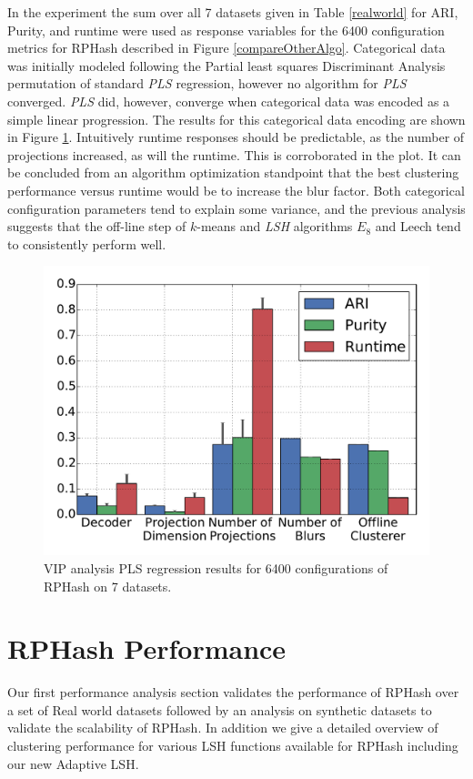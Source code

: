 In the experiment the sum over all 7 datasets given in Table \ref{realworld} for ARI, Purity, and
runtime were used as response variables for the 6400 configuration metrics for \textsf{RPHash}
described in Figure \ref{compareOtherAlgo}.  Categorical data was initially modeled following the
Partial least squares Discriminant Analysis permutation of standard \emph{PLS} regression, however
no algorithm for \emph{PLS} converged.  \emph{PLS} did, however, converge when categorical data was
encoded as a simple linear progression.  The results for this categorical data encoding are shown in
Figure \ref{PLSreg}.  Intuitively runtime responses should be predictable, as the number of
projections increased, as will the runtime.  This is corroborated in the plot.  It can be concluded
from an algorithm optimization standpoint that the best clustering performance versus runtime would
be to increase the blur factor.  Both categorical configuration parameters tend to explain some
variance, and the previous analysis suggests that the off-line step of $k$-means and \emph{LSH}
algorithms $E_8$ and Leech tend to consistently perform well.

\begin{figure}
  \centerline{\includegraphics[width=.8\textwidth]{figs/correlation}}
  \caption{VIP analysis PLS regression results for 6400 configurations of \textsf{RPHash} on 7
    datasets.}\label{PLSreg}
\end{figure}

\section{RPHash Performance}

Our first performance analysis section validates the performance of \textsf{RPHash} over a set of Real world
datasets followed by an analysis on synthetic datasets to validate the scalability of \textsf{RPHash}.  In
addition we give a detailed overview of clustering performance for various LSH functions available
for \textsf{RPHash} including our new Adaptive LSH.

